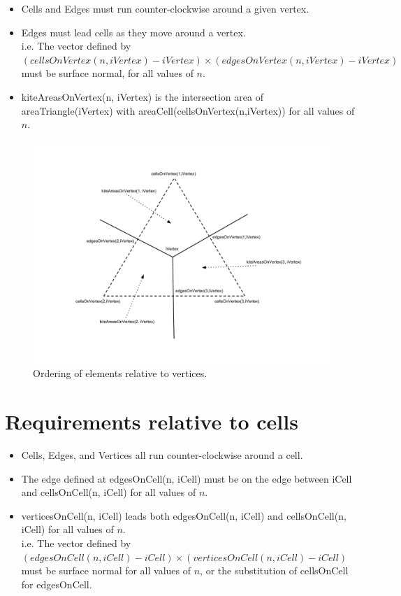 \documentclass[11pt]{report}
\begin{document}
\begin{itemize}
	\item Cells and Edges must run counter-clockwise around a given vertex.
	\item Edges must lead cells as they move around a vertex. \\
		  i.e. The vector defined by  \\
		  {\small $(cellsOnVertex(n, iVertex) - iVertex) \times (edgesOnVertex(n, iVertex) - iVertex)$} \\
		  must be surface normal, for all values of $n$.
	\item kiteAreasOnVertex(n, iVertex) is the intersection area of areaTriangle(iVertex) with areaCell(cellsOnVertex(n,iVertex)) for all values of $n$.
\end{itemize}

\begin{figure}
	\centering
	\includegraphics[scale=0.4]{figures/Vertex Diagram.pdf}
	\caption{Ordering of elements relative to vertices.}
\end{figure}

\section{Requirements relative to cells}

\begin{itemize}
	\item Cells, Edges, and Vertices all run counter-clockwise around a cell.
	\item The edge defined at edgesOnCell(n, iCell) must be on the edge between iCell and cellsOnCell(n, iCell) for all values of $n$.
	\item verticesOnCell(n, iCell) leads both edgesOnCell(n, iCell) and cellsOnCell(n, iCell) for all values of $n$. \\
		  i.e. The vector defined by \\
		  {\small $(edgesOnCell(n, iCell) - iCell) \times (verticesOnCell(n, iCell) - iCell)$} \\
		  must be surface normal for all values of $n$, or the substitution of cellsOnCell for edgesOnCell.
\end{itemize}
\end{document}
